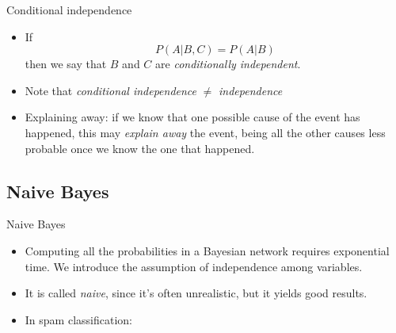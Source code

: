 \documentclass[xcolor=x11names,compress]{beamer}
\renewcommand{\(}{\begin{columns}}
\renewcommand{\)}{\end{columns}}
\newcommand{\<}[1]{\begin{column}{#1}}
\renewcommand{\>}{\end{column}}
\begin{document}

\begin{frame}{Conditional independence}
  \begin{itemize}
    \item<1->{If
    $$
    P(A|B,C) = P(A|B)
    $$
    then we say that $B$ and $C$ are \textit{conditionally independent}.}
    \item<2->{
        Note that \textit{conditional independence} $\neq$ \textit{independence}
    }
    \item<3->Explaining away: if we know that one possible cause of the event has happened, this may \textit{explain away} the event, being all the other causes less probable once we know the one that happened.
  \end{itemize}
\end{frame}

\subsection{Naive Bayes}
\begin{frame}{Naive Bayes}
\begin{itemize}
    \item<1->Computing all the probabilities in a Bayesian network requires exponential time.
      We introduce the assumption of independence among variables.
    \item<2->It is called \textit{naive}, since it's often unrealistic, but it yields good results.
    \item<3->In spam classification:
      \begin{center}
      \end{center}
\end{itemize}
\end{frame}

\end{document}
